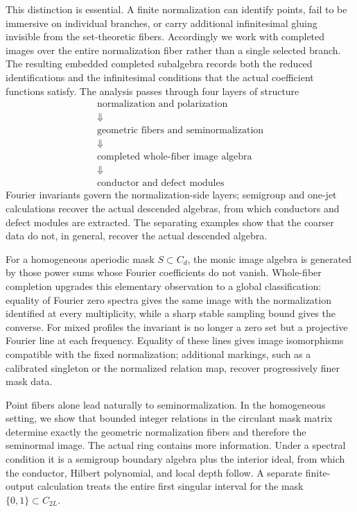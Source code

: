 \documentclass[10pt,fleqn]{article}
\numberwithin{equation}{section}
\begin{document}
This distinction is essential.  A finite normalization can identify points,
fail to be immersive on individual branches, or carry additional
infinitesimal gluing invisible from the set-theoretic fibers.  Accordingly we
work with completed images over the entire normalization fiber rather than a
single selected branch.  The resulting embedded completed subalgebra records
both the reduced identifications and the infinitesimal conditions that the
actual coefficient functions satisfy.  The analysis passes through four layers of structure
\[
 \begin{gathered}
 \text{normalization and polarization}\\[-1pt]
 \Downarrow\\[-1pt]
 \text{geometric fibers and seminormalization}\\[-1pt]
 \Downarrow\\[-1pt]
 \text{completed whole-fiber image algebra}\\[-1pt]
 \Downarrow\\[-1pt]
 \text{conductor and defect modules}
 \end{gathered}
\]
Fourier invariants govern the normalization-side layers; semigroup and one-jet
calculations recover the actual descended algebras, from which conductors and
defect modules are extracted.  The separating examples show that the coarser
data do not, in general, recover the actual descended algebra.

For a homogeneous aperiodic mask \(S\subset C_d\), the monic image algebra is
generated by those power sums whose Fourier coefficients do not vanish.
Whole-fiber completion upgrades this elementary observation to a global
classification: equality of Fourier zero spectra gives the same image with
the normalization identified at every multiplicity, while a sharp stable
sampling bound gives the converse.  For mixed profiles the invariant is no
longer a zero set but a projective Fourier line at each frequency.  Equality
of these lines gives image isomorphisms compatible with the fixed
normalization; additional markings, such as a calibrated singleton or the
normalized relation map, recover progressively finer mask data.

Point fibers alone lead naturally to seminormalization.  In the homogeneous
setting, we show that bounded integer relations in the circulant mask matrix
determine exactly the geometric normalization fibers and therefore the
seminormal image.  The
actual ring contains more information.  Under a spectral condition it is a
semigroup boundary algebra plus the interior ideal, from which the conductor,
Hilbert polynomial, and local depth follow.  A separate finite-output
calculation treats the entire first singular interval for the mask
\(\{0,1\}\subset C_{2L}\).
\end{document}
